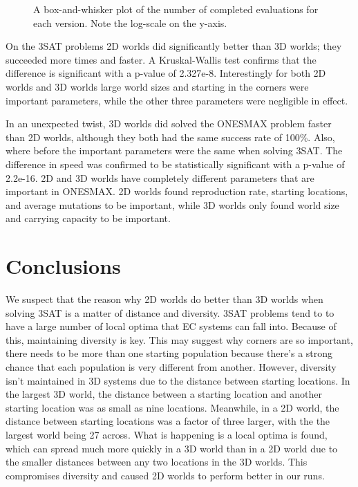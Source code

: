 \documentclass[12pt]{article}
\begin{document}
\begin{figure}[tb]

 \centering
 \caption{A box-and-whisker plot of the number of completed evaluations for each version. Note the log-scale on the y-axis.}
 \label{fig:evalPlots}

\end{figure}

On the 3SAT problems 2D worlds did significantly better than 3D worlds; they succeeded more times and faster. A Kruskal-Wallis test confirms that the difference is significant with a p-value of 2.327e-8. Interestingly for both 2D worlds and 3D worlds large world sizes and starting in the corners were important parameters, while the other three parameters were negligible in effect. 

In an unexpected twist, 3D worlds did solved the ONESMAX problem faster than 2D worlds, although they both had the same success rate of 100\%. Also, where before the important parameters were the same when solving 3SAT. The difference in speed was confirmed to be statistically significant with a p-value of 2.2e-16. 2D and 3D worlds have completely different parameters that are important in ONESMAX. 2D worlds found reproduction rate, starting locations, and average mutations to be important, while 3D worlds only found world size and carrying capacity to be important.

\section{Conclusions} \label{sec:conclusion}

We suspect that the reason why 2D worlds do better than 3D worlds when solving 3SAT is a matter of distance and diversity. 3SAT problems tend to to have a large number of local optima that EC systems can fall into. Because of this, maintaining diversity is key. This may suggest why corners are so important, there needs to be more than one starting population because there's a strong chance that each population is very different from another. However, diversity isn't maintained in 3D systems due to the distance between starting locations. In the largest 3D world, the distance between a starting location and another starting location was as small as nine locations. Meanwhile, in a 2D world, the distance between starting locations was a factor of three larger, with the the largest world being 27 across. What is happening is a local optima is found, which can spread much more quickly in a 3D world than in a 2D world due to the smaller distances between any two locations in the 3D worlds. This compromises diversity and caused 2D worlds to perform better in our runs.
\end{document}
